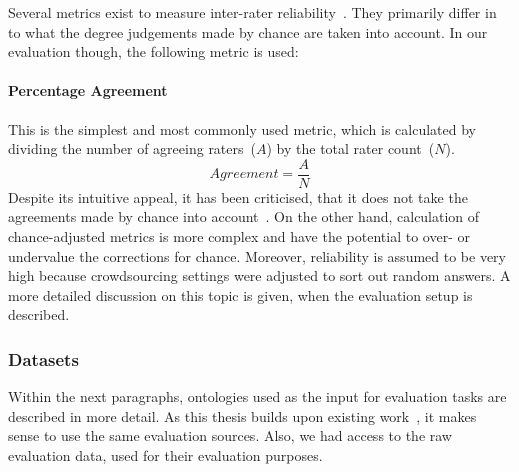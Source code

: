 \documentclass[draft,final]{vutinfth} %
\begin{document}
Several metrics exist to measure inter-rater reliability~\cite{zhao2013}. They primarily differ in to what the degree judgements made by chance are taken into account. In our evaluation though, the following metric is used:
\paragraph{Percentage Agreement}
This is the simplest and most commonly used metric, which is calculated by dividing the number of agreeing raters~($A$) by the total rater count~($N$).
\[ Agreement = \frac{A}{N} \]
Despite its intuitive appeal, it has been criticised, that it does not take the agreements made by chance into account~\cite{hunt1986}. On the other hand, calculation of chance-adjusted metrics is more complex and have the potential to over- or undervalue the corrections for chance.  
Moreover, reliability is assumed to be very high because crowdsourcing settings were adjusted to sort out random answers. A more detailed discussion on this topic is given, when the evaluation setup is described.  

\subsubsection{Datasets}
Within the next paragraphs, ontologies used as the input for evaluation tasks are described in more detail. As this thesis builds upon existing work~\cite{wohlgenannt2016}, it makes sense to use the same evaluation sources. Also, we had access to the raw evaluation data, used for their evaluation purposes. 





%
\end{document}
